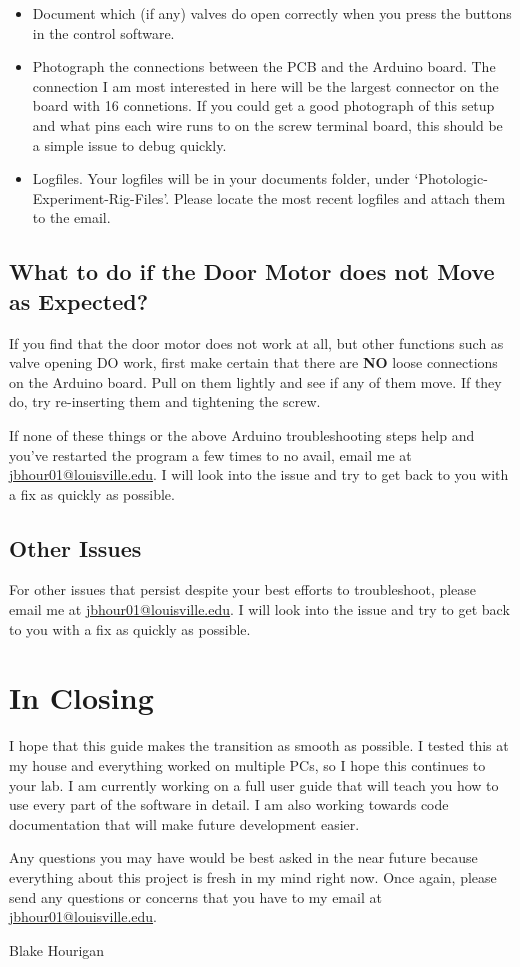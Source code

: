 \documentclass{article}
\begin{document}
\begin{itemize}
    \item Document which (if any) valves do open correctly when you press the buttons in the control software.
    \item Photograph the connections between the PCB and the Arduino board. The connection I am most interested in here will be the largest connector on the board with 16 connetions. If 
        you could get a good photograph of this setup and what pins each wire runs to on the screw terminal board, this should be a simple issue to debug quickly.
    \item Logfiles. Your logfiles will be in your documents folder, under `Photologic-Experiment-Rig-Files'. Please locate the most recent logfiles and attach them to the email.
\end{itemize}

\subsection{What to do if the Door Motor does not Move as Expected?}
If you find that the door motor does not work at all, but other functions such as valve opening DO work, first make certain that there
are \textbf{NO} loose connections on the Arduino board. Pull on them lightly and see if any of them move. If they do, try re-inserting them and tightening the screw. 

If none of 
these things or the above Arduino troubleshooting steps help and you've restarted the program a few times to no avail, email me at \url{jbhour01@louisville.edu}. 
I will look into the issue and try to get back to you with a fix as quickly as possible.

\subsection{Other Issues} 
For other issues that persist despite your best efforts to troubleshoot, please email me at \url{jbhour01@louisville.edu}. 
I will look into the issue and try to get back to you with a fix as quickly as possible.

\newpage
\section{In Closing}
I hope that this guide makes the transition as smooth as possible. I tested this at my house and everything worked on multiple PCs, so I hope this continues to your lab. I am 
currently working on a full user guide that will teach you how to use every part of the software in detail. I am also working towards code documentation that will make 
future development easier. 
\par Any questions 
you may have would be best asked in the near future because everything about this project is fresh in my mind right now. Once again, please send any questions or 
concerns that you have to 
my email at \url{jbhour01@louisville.edu}. 

Blake Hourigan
\end{document}
